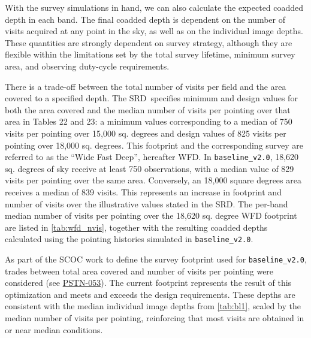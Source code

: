 \documentclass[PST,authoryear,toc]{lsstdoc}
\newcommand{\baseline}{\texttt{baseline\_v2.0}}
\begin{document}
With the survey simulations in hand, we can also calculate the expected coadded depth in each band. The final coadded depth is dependent on the number of visits acquired at any point in the sky, as well as on the individual image depths. These quantities are strongly dependent on survey strategy, although they are flexible within the limitations set by the total survey lifetime, minimum survey area, and observing duty-cycle requirements.

There is a trade-off between the total number of visits per field and the area covered to a specified depth. 
The SRD\ specifies minimum and design values for both the area covered and the median number of visits per pointing over that area in Tables 22 and 23: a minimum values corresponding to a median of 750 visits per pointing over 15,000 sq. degrees and design values of 825 visits per pointing over 18,000 sq. degrees. This footprint and the corresponding survey are referred to as the ``Wide Fast Deep'', hereafter WFD. In  \baseline, 18,620 sq. degrees of sky receive at least 750 observations, with a median value of 829 visits per pointing over the same area.  Conversely, an 18,000 square degrees area receives a median of 839 visits.
This represents an increase in footprint and number of visits over the illustrative values stated in the SRD. The per-band median number of visits per pointing over the 18,620 sq. degree WFD footprint are listed in \autoref{tab:wfd_nvis}, together with the resulting coadded depths calculated using the pointing histories simulated in \baseline. 

 
  As part of the SCOC work to define the survey footprint used for \baseline, trades between total area covered and number of visits per pointing were considered (see \href{https://pstn-053.lsst.io}{{PSTN-053}}). The current footprint represents the result of this optimization and meets and exceeds the design requirements.
  These depths are consistent with the median individual image depths from \autoref{tab:bl1}, scaled by the median number of visits per pointing, reinforcing that most visits are obtained in or near median conditions. 
 
\FloatBarrier
\end{document}

